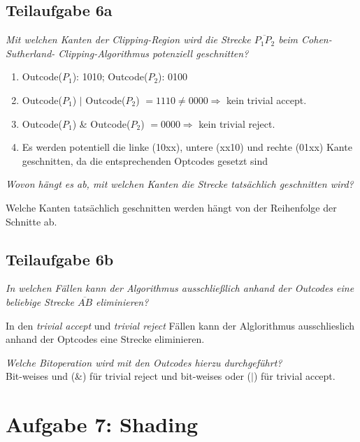 \documentclass[a4paper]{scrartcl}
\begin{document}
\subsection*{Teilaufgabe 6a}
\textit{Mit welchen Kanten der Clipping-Region wird die Strecke $\overline{P_{1}P_{2}}$ beim Cohen-Sutherland-
Clipping-Algorithmus potenziell geschnitten?}

\begin{enumerate}
    \item Outcode($P_1$): 1010; Outcode($P_2$): 0100
    \item Outcode($P_1$) $|$ Outcode($P_2$) $ = 1110 \neq 0000 \Rightarrow$ kein trivial accept.
    \item Outcode($P_1$) \& Outcode($P_2$) $ = 0000 \Rightarrow$ kein trivial reject.
    \item Es werden potentiell die linke (10xx), untere (xx10) und rechte
          (01xx) Kante geschnitten, da die entsprechenden Optcodes gesetzt sind
\end{enumerate}

\textit{Wovon hängt es ab, mit welchen Kanten die Strecke tatsächlich
geschnitten wird?}

Welche Kanten tatsächlich geschnitten werden hängt von der Reihenfolge der
Schnitte ab.


\subsection*{Teilaufgabe 6b}

\textit{In welchen Fällen kann der Algorithmus ausschließlich anhand der Outcodes eine
beliebige Strecke $\overline{AB}$ eliminieren?}

In den \textit{trivial accept} und \textit{trivial reject} Fällen kann der
Alglorithmus ausschlieslich anhand der Optcodes eine Strecke eliminieren.

\textit{Welche Bitoperation wird mit den Outcodes hierzu durchgeführt?}\\

Bit-weises und (\&) für trivial reject und bit-weises oder ($|$) für trivial
accept.


\section*{Aufgabe 7: Shading}
\end{document}
